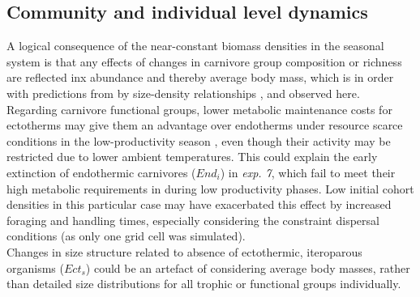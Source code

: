 \subsection{Community and individual level dynamics}
A logical consequence of the near-constant biomass densities in the seasonal system is that any effects of changes in carnivore group composition or richness are reflected inx abundance and thereby average body mass, which is in order with predictions from by size-density relationships \citep[cf.][]{White2007}, and observed here. \\
Regarding carnivore functional groups, lower metabolic maintenance costs for ectotherms may give them an advantage over endotherms under resource scarce conditions in the low-productivity season \citep{Shine2005}, even though their activity may be restricted due to lower ambient temperatures. 
This could explain the early extinction of endothermic carnivores ($End_i$) in \textit{exp. 7}, which fail to meet their high metabolic requirements in during low productivity phases. Low initial cohort densities in this particular case may have exacerbated this effect by increased foraging and handling times, especially considering the constraint dispersal conditions (as only one grid cell was simulated).\\
Changes in size structure related to absence of ectothermic, iteroparous organisms ($Ect_s$) could be an artefact of considering average body masses, rather than detailed size distributions for all trophic or functional groups individually.
%
%


